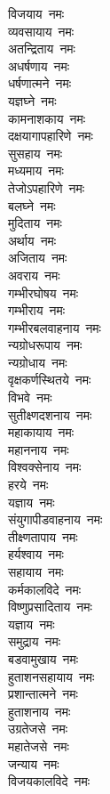 \begin{multicols}{2}
\begin{flushleft}
विजयाय~नमः\\
व्यवसायाय~नमः\\
अतन्द्रिताय~नमः\\
अधर्षणाय~नमः\\
धर्षणात्मने~नमः\\
यज्ञघ्ने~नमः\\
कामनाशकाय~नमः\\
दक्षयागापहारिणे~नमः\\
सुसहाय~नमः\\
मध्यमाय~नमः\hfill{}\\
तेजोऽपहारिणे~नमः\\
बलघ्ने~नमः\\
मुदिताय~नमः\\
अर्थाय~नमः\\
अजिताय~नमः\\
अवराय~नमः\\
गम्भीरघोषय~नमः\\
गम्भीराय~नमः\\
गम्भीरबलवाहनाय~नमः\\
न्यग्रोधरूपाय~नमः\hfill{}\\
न्यग्रोधाय~नमः\\
वृक्षकर्णस्थितये~नमः\\
विभवे~नमः\\
सुतीक्ष्णदशनाय~नमः\\
महाकायाय~नमः\\
महाननाय~नमः\\
विश्वक्सेनाय~नमः\\
हरये~नमः\\
यज्ञाय~नमः\\
संयुगापीडवाहनाय~नमः\hfill{}\\
तीक्ष्णतापाय~नमः\\
हर्यश्वाय~नमः\\
सहायाय~नमः\\
कर्मकालविदे~नमः\\
विष्णुप्रसादिताय~नमः\\
यज्ञाय~नमः\\
समुद्राय~नमः\\
बडवामुखाय~नमः\\
हुताशनसहायाय~नमः\\
प्रशान्तात्मने~नमः\hfill{}\\
हुताशनाय~नमः\\
उग्रतेजसे~नमः\\
महातेजसे~नमः\\
जन्याय~नमः\\
विजयकालविदे~नमः\\

\end{flushleft}
\end{multicols}
